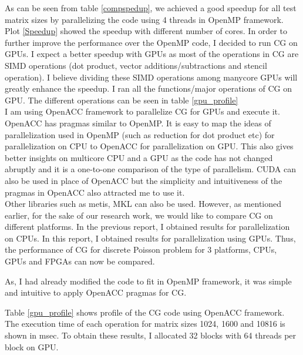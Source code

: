 \documentclass{article}
\begin{document}
\begin{spacing}{1.1}
    As can be seen from table \ref{compspedup}, we achieved a good speedup for all test matrix sizes by parallelizing the code using 4 threads in OpenMP framework. Plot \ref{Speedup} showed the speedup with different number of cores. In order to further improve the performance over the OpenMP code, I decided to run CG on GPUs. I expect a better speedup with GPUs as most of the operations in CG are SIMD operations (dot product, vector additions/subtractions and stencil operation). I believe dividing these SIMD operations among manycore GPUs will greatly enhance the speedup. I ran all the functions/major operations of CG on GPU. The different operations can be seen in table \ref{gpu_profile}\\
    I am using OpenACC framework to parallelize CG for GPUs and execute it. 
    OpenACC has pragmas similar to OpenMP. It is easy to map the ideas of parallelization used in OpenMP (such as reduction for dot product etc) for parallelization on CPU to OpenACC for parallelization on GPU. This also gives better insights on multicore CPU and a GPU as the code has not changed abruptly and it is a one-to-one comparison of the type of parallelism. CUDA can also be used in place of OpenACC but the simplicity and intuitiveness of the pragmas in OpenACC also attracted me to use it.  \\
    Other libraries such as metis, MKL can also be used. However, as mentioned earlier, for the sake of our research work, we would like to compare CG on different platforms. In the previous report, I obtained results for parallelization on CPUs. In this report, I obtained results for parallelization using GPUs. Thus, the performance of CG for discrete Poisson problem for 3 platforms, CPUs, GPUs and FPGAs can now be compared. 
    
    As, I had already modified the code to fit in OpenMP framework, it was simple and intuitive to apply OpenACC pragmas for CG. 
    
    Table \ref{gpu_profile} shows profile of the CG code using OpenACC framework. The execution time of each operation for matrix sizes 1024, 1600 and 10816 is shown in msec. To obtain these results, I allocated 32 blocks with 64 threads per block on GPU. 
    

\end{spacing}
\end{document}
